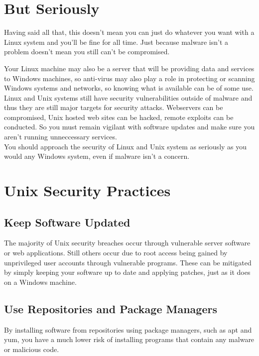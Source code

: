 \section{But Seriously}

Having said all that, this doesn't mean you can just do whatever you want with a Linux system and you'll be fine for all time.  Just because malware isn't a problem doesn't mean you still can't be compromised.

Your Linux machine may also be a server that will be providing data and services to Windows machines, so anti-virus may also play a role in protecting or scanning Windows systems and networks, so knowing what is available can be of some use.\\

Linux and Unix systems still have security vulnerabilities outside of malware and thus they are still major targets for security attacks.  Webservers can be compromised, Unix hosted web sites can be hacked, remote exploits can be conducted.  So you must remain vigilant with software updates and make sure you aren't running unneccessary services.\\

You should approach the security of Linux and Unix system as seriously as you would any Windows system, even if malware isn't a concern.

\section{Unix Security Practices}

\subsection{Keep Software Updated}

The majority of Unix security breaches occur through vulnerable server software or web applications.  Still others occur due to root access being gained by unprivileged user accounts through vulnerable programs.  These can be mitigated by simply keeping your software up to date and applying patches, just as it does on a Windows machine.

\subsection{Use Repositories and Package Managers}

By installing software from repositories using package managers, such as apt and yum, you have a much lower risk of installing programs that contain any malware or malicious code.

